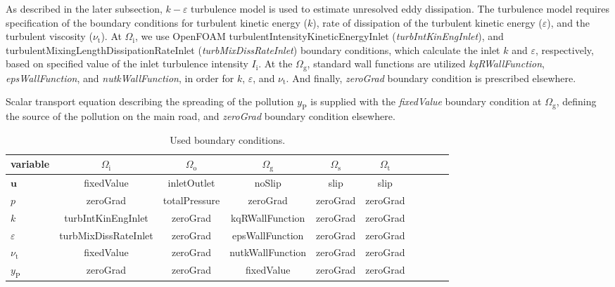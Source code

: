 As described in the later subsection, $k-\varepsilon$ turbulence model is used to estimate unresolved eddy dissipation. The turbulence model requires specification of the boundary conditions for turbulent kinetic energy ($k$), rate of dissipation of the turbulent kinetic energy ($\varepsilon$), and the turbulent viscosity ($\nu_{\mathrm{t}}$). At $\Omega_{\mathrm{i}}$, we use OpenFOAM turbulentIntensityKineticEnergyInlet (\textit{turbIntKinEngInlet}), and turbulentMixingLengthDissipationRateInlet (\textit{turbMixDissRateInlet}) boundary conditions, which calculate the inlet $k$ and $\varepsilon$, respectively, based on specified value of the inlet turbulence intensity $I_{\mathrm{i}}$. At the $\Omega_{\mathrm{g}}$, standard wall functions are utilized \textit{kqRWallFunction}, \textit{epsWallFunction}, and \textit{nutkWallFunction}, in order for $k$, $\varepsilon$, and $\nu_{\mathrm{t}}$. And finally, \textit{zeroGrad} boundary condition is prescribed elsewhere.

Scalar transport equation describing the spreading of the pollution $y_{\mathrm{P}}$ is supplied with the \textit{fixedValue} boundary condition at $\Omega_{\mathrm{g}}$, defining the source of the pollution on the main road, and \textit{zeroGrad} boundary condition elsewhere.

\begin{table}[htbp]
    \caption{Used boundary conditions.}
    \label{tab:bc}
    \centering
    {
    \begin{tabular}{lccccccccc}
        \hline
        variable & $\Omega_{\mathrm{i}}$ & $\Omega_{\mathrm{o}}$ & $\Omega_{\mathrm{g}}$ &  $\Omega_{\mathrm{s}}$ & $\Omega_{\mathrm{t}}$ \\
        \hline
        $\bm{u}$ & fixedValue & inletOutlet & noSlip & slip & slip\\
        $p$ & zeroGrad & totalPressure & zeroGrad & zeroGrad & zeroGrad\\
        $k$ & turbIntKinEngInlet & zeroGrad & kqRWallFunction & zeroGrad & zeroGrad\\
        $\varepsilon$ & turbMixDissRateInlet & zeroGrad & epsWallFunction & zeroGrad & zeroGrad\\
        $\nu_{\mathrm{t}}$ & fixedValue & zeroGrad & nutkWallFunction & zeroGrad & zeroGrad\\
        $y_{\mathrm{P}}$ & zeroGrad & zeroGrad & fixedValue & zeroGrad & zeroGrad\\
        \hline
    \end{tabular}
    }
\end{table}

